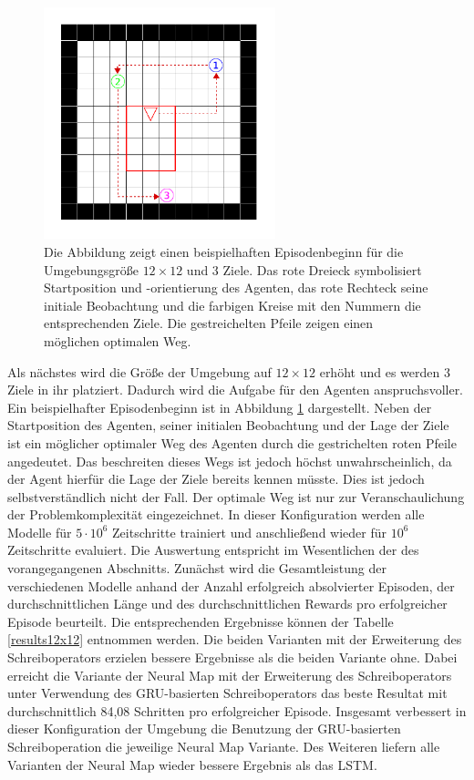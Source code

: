\begin{figure}[ht!]
  \centering
  \includegraphics[keepaspectratio,width=0.6\textwidth]{abbildungen/12x12_ep_start.pdf}
  \caption{Die Abbildung zeigt einen beispielhaften Episodenbeginn für die Umgebungsgröße $12 \times 12$ und 3 Ziele. Das rote Dreieck symbolisiert Startposition und -orientierung des Agenten, das rote Rechteck seine initiale Beobachtung und die farbigen Kreise mit den Nummern die entsprechenden Ziele. Die gestreichelten Pfeile zeigen einen möglichen optimalen Weg.}
  \label{fig_12x12_ep_start}
\end{figure}

Als nächstes wird die Größe der Umgebung auf $12 \times 12$ erhöht und es werden 3 Ziele in ihr platziert. Dadurch wird die Aufgabe für den Agenten anspruchsvoller. Ein beispielhafter Episodenbeginn ist in Abbildung \ref{fig_12x12_ep_start} dargestellt. Neben der Startposition des Agenten, seiner initialen Beobachtung und der Lage der Ziele ist ein möglicher optimaler Weg des Agenten durch die gestrichelten roten Pfeile angedeutet. Das beschreiten dieses Wegs ist jedoch höchst unwahrscheinlich, da der Agent hierfür die Lage der Ziele bereits kennen müsste. Dies ist jedoch selbstverständlich nicht der Fall. Der optimale Weg ist nur zur Veranschaulichung der Problemkomplexität eingezeichnet. In dieser Konfiguration werden alle Modelle für $5\cdot10^6$ Zeitschritte trainiert und anschließend wieder für $10^6$ Zeitschritte evaluiert. Die Auswertung entspricht im Wesentlichen der des vorangegangenen Abschnitts. Zunächst wird die Gesamtleistung der verschiedenen Modelle anhand der Anzahl erfolgreich absolvierter Episoden, der durchschnittlichen Länge und des durchschnittlichen Rewards pro erfolgreicher Episode beurteilt. Die entsprechenden Ergebnisse können der Tabelle \ref{results12x12} entnommen werden. Die beiden Varianten mit der Erweiterung des Schreiboperators erzielen bessere Ergebnisse als die beiden Variante ohne. Dabei erreicht die Variante der Neural Map mit der Erweiterung des Schreiboperators unter Verwendung des GRU-basierten Schreiboperators das beste Resultat mit durchschnittlich 84,08 Schritten pro erfolgreicher Episode. Insgesamt verbessert in dieser Konfiguration der Umgebung die Benutzung der GRU-basierten Schreiboperation die jeweilige Neural Map Variante. Des Weiteren liefern alle Varianten der Neural Map wieder bessere Ergebnis als das LSTM.


